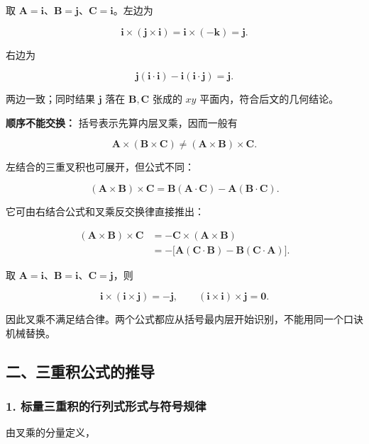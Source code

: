 取
\(\mathbf A=\mathbf i\)、\(\mathbf B=\mathbf j\)、\(\mathbf C=\mathbf i\)。左边为

\[
\mathbf i\times(\mathbf j\times\mathbf i)
=\mathbf i\times(-\mathbf k)=\mathbf j.
\]

右边为

\[
\mathbf j(\mathbf i\cdot\mathbf i)-\mathbf i(\mathbf i\cdot\mathbf j)
=\mathbf j.
\]

两边一致；同时结果 \(\mathbf j\) 落在 \(\mathbf B,\mathbf C\) 张成的
\(xy\) 平面内，符合后文的几何结论。

\textbf{顺序不能交换：} 括号表示先算内层叉乘，因而一般有

\[
\mathbf A\times(\mathbf B\times\mathbf C)
\ne
(\mathbf A\times\mathbf B)\times\mathbf C.
\]

左结合的三重叉积也可展开，但公式不同：

\[
(\mathbf A\times\mathbf B)\times\mathbf C
=\mathbf B(\mathbf A\cdot\mathbf C)
-\mathbf A(\mathbf B\cdot\mathbf C).
\]

它可由右结合公式和叉乘反交换律直接推出：

\[
\begin{aligned}
(\mathbf A\times\mathbf B)\times\mathbf C
&=-\mathbf C\times(\mathbf A\times\mathbf B)\\
&=-\big[\mathbf A(\mathbf C\cdot\mathbf B)
-\mathbf B(\mathbf C\cdot\mathbf A)\big].
\end{aligned}
\]

取
\(\mathbf A=\mathbf i\)、\(\mathbf B=\mathbf i\)、\(\mathbf C=\mathbf j\)，则

\[
\mathbf i\times(\mathbf i\times\mathbf j)=-\mathbf j,
\qquad
(\mathbf i\times\mathbf i)\times\mathbf j=\mathbf0.
\]

因此叉乘不满足结合律。两个公式都应从括号最内层开始识别，不能用同一个口诀机械替换。

\subsection{二、三重积公式的推导}\label{m1:ux4e8cux4e09ux91cdux79efux516cux5f0fux7684ux63a8ux5bfc}

\subsubsection{1.
标量三重积的行列式形式与符号规律}\label{m1:ux6807ux91cfux4e09ux91cdux79efux7684ux884cux5217ux5f0fux5f62ux5f0fux4e0eux7b26ux53f7ux89c4ux5f8b}

由叉乘的分量定义，

